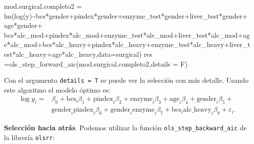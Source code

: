 \documentclass[
]{article}
\newenvironment{Shaded}{\begin{snugshade}}{\end{snugshade}}
\newcommand{\AttributeTok}[1]{\textcolor[rgb]{0.77,0.63,0.00}{#1}}
\newcommand{\FunctionTok}[1]{\textcolor[rgb]{0.00,0.00,0.00}{#1}}
\newcommand{\NormalTok}[1]{#1}
\newcommand{\OtherTok}[1]{\textcolor[rgb]{0.56,0.35,0.01}{#1}}
\newcommand{\SpecialCharTok}[1]{\textcolor[rgb]{0.00,0.00,0.00}{#1}}
\begin{document}
\begin{Shaded}
\begin{Highlighting}[]
\NormalTok{mod.surgical.completo2 }\OtherTok{=} \FunctionTok{lm}\NormalTok{(}\FunctionTok{log}\NormalTok{(y)}\SpecialCharTok{\textasciitilde{}}\NormalTok{bcs}\SpecialCharTok{*}\NormalTok{gender}\SpecialCharTok{+}\NormalTok{pindex}\SpecialCharTok{*}\NormalTok{gender}\SpecialCharTok{+}\NormalTok{enzyme\_test}\SpecialCharTok{*}\NormalTok{gender}\SpecialCharTok{+}\NormalTok{liver\_test}\SpecialCharTok{*}\NormalTok{gender}\SpecialCharTok{+}\NormalTok{age}\SpecialCharTok{*}\NormalTok{gender}\SpecialCharTok{+}\NormalTok{ bcs}\SpecialCharTok{*}\NormalTok{alc\_mod}\SpecialCharTok{+}\NormalTok{pindex}\SpecialCharTok{*}\NormalTok{alc\_mod}\SpecialCharTok{+}\NormalTok{enzyme\_test}\SpecialCharTok{*}\NormalTok{alc\_mod}\SpecialCharTok{+}\NormalTok{liver\_test}\SpecialCharTok{*}\NormalTok{alc\_mod}\SpecialCharTok{+}\NormalTok{age}\SpecialCharTok{*}\NormalTok{alc\_mod}\SpecialCharTok{+}\NormalTok{bcs}\SpecialCharTok{*}\NormalTok{alc\_heavy}\SpecialCharTok{+}\NormalTok{pindex}\SpecialCharTok{*}\NormalTok{alc\_heavy}\SpecialCharTok{+}\NormalTok{enzyme\_test}\SpecialCharTok{*}\NormalTok{alc\_heavy}\SpecialCharTok{+}\NormalTok{liver\_test}\SpecialCharTok{*}\NormalTok{alc\_heavy}\SpecialCharTok{+}\NormalTok{age}\SpecialCharTok{*}\NormalTok{alc\_heavy,}\AttributeTok{data=}\NormalTok{surgical)}
\NormalTok{res }\OtherTok{=}\FunctionTok{ols\_step\_forward\_aic}\NormalTok{(mod.surgical.completo2,}\AttributeTok{details =}\NormalTok{ F)}
\end{Highlighting}
\end{Shaded}

Con el argumento \texttt{details\ =\ T} se puede ver la selección con más detalle. Usando este algoritmo el modelo óptimo es:
\begin{equation}
\begin{split}
\log y_{i} =& \beta_{0} + \mbox{bcs}_{i}\beta_{1} + \mbox{pindex}_{i}\beta_{2} + \mbox{enzyme}_{i}\beta_{3} + \mbox{age}_{i}\beta_{4} + \mbox{gender}_{i}\beta_{5} + \\
&\mbox{gender}_{i}\mbox{pindex}_{i}\beta_{6} + \mbox{gender}_{i}\mbox{enzyme}_{i}\beta_{7} + \mbox{bcs}_{i}\mbox{alc_heavy}_{i}\beta_{8} + \varepsilon_{i}.
\end{split}
\nonumber
\end{equation}

\textbf{Selección hacia atrás}. Podemos utilizar la función \texttt{ols\_step\_backward\_aic} de la librería \texttt{olsrr}:
\end{document}
